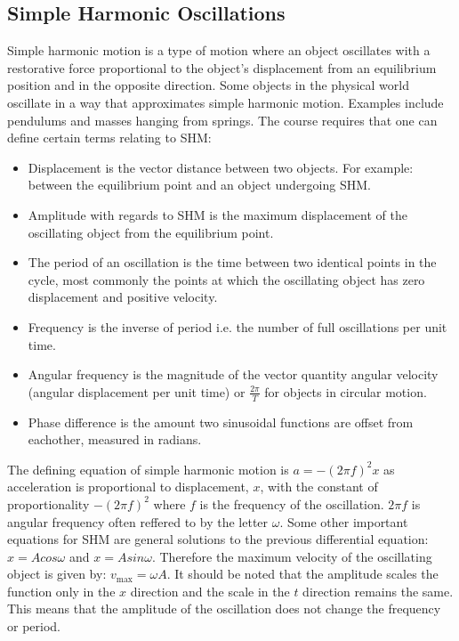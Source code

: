 \documentclass[a4,8pt]{article}
\begin{document}
\subsection{Simple Harmonic Oscillations}
Simple harmonic motion is a type of motion where an object oscillates with a 
restorative force proportional to the object's displacement from an equilibrium 
position and in the opposite direction. Some objects in the physical world 
oscillate in a way that approximates simple harmonic motion. Examples include 
pendulums and masses hanging from springs. The course requires that one can 
define certain terms relating to SHM:
\begin{itemize}
	\item Displacement is the vector distance between two objects. For example: 
    between the equilibrium point and an object undergoing SHM.
	\item Amplitude with regards to SHM is the maximum displacement of the 
    oscillating object from the equilibrium point.
	\item The period of an oscillation is the time between two identical points 
    in the cycle, most commonly the points at which the oscillating object has 
    zero displacement and positive velocity.
	\item Frequency is the inverse of period i.e. the number of full 
    oscillations per unit time.
	\item Angular frequency is the magnitude of the vector quantity angular 
    velocity (angular displacement per unit time) or $\frac{2\pi}{T}$ for 
    objects in circular motion.
	\item Phase difference is the amount two sinusoidal functions are offset 
    from eachother, measured in radians.
\end{itemize}

The defining equation of simple harmonic motion is $a=-(2\pi f)^2 x$ as 
acceleration is proportional to displacement, $x$, with the constant of 
proportionality $-(2\pi f)^2$ where $f$ is the frequency of the oscillation. 
$2\pi f$ is angular frequency often reffered to by the letter $\omega$. Some 
other important equations for SHM are general solutions to the previous 
differential equation: $x=Acos\omega$ and $x=Asin\omega$. Therefore the maximum 
velocity of the oscillating object is given by: $v_\text{max}=\omega A$. It 
should be noted that the amplitude scales the function only in the $x$ direction 
and the scale in the $t$ direction remains the same. This means that the 
amplitude of the oscillation does not change the frequency or period.
\vspace{8pt}
\end{document}
